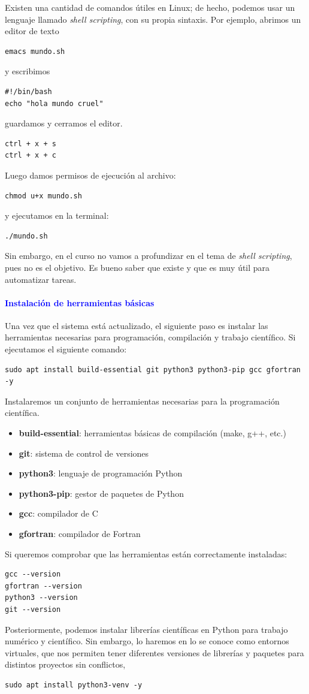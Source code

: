 \documentclass[12pt]{article}
\begin{document}
Existen una cantidad de comandos útiles en Linux; de hecho, podemos usar un lenguaje llamado 
\textit{shell scripting}, con su propia sintaxis. Por ejemplo, abrimos un editor de texto 
\begin{lstlisting}
emacs mundo.sh
\end{lstlisting}  
y escribimos 
\begin{lstlisting}
#!/bin/bash
echo "hola mundo cruel"
\end{lstlisting}  
guardamos y cerramos el editor.
\begin{lstlisting}
ctrl + x + s
ctrl + x + c
\end{lstlisting} 
Luego damos permisos de ejecución al archivo:
\begin{lstlisting}
chmod u+x mundo.sh
\end{lstlisting}
y ejecutamos en la terminal:
\begin{lstlisting}
./mundo.sh
\end{lstlisting}
Sin embargo, en el curso no vamos a profundizar en el tema de \textit{shell scripting}, pues no es el objetivo. 
Es bueno saber que existe y que es muy útil para automatizar tareas.

\paragraph{\textcolor{blue}{Instalación de herramientas básicas}}

Una vez que el sistema está actualizado, el siguiente paso es instalar las herramientas 
necesarias para programación, compilación y trabajo científico.
Si ejecutamos el siguiente comando:
\begin{lstlisting}
sudo apt install build-essential git python3 python3-pip gcc gfortran -y
\end{lstlisting}
Instalaremos un conjunto de herramientas necesarias para la programación científica.
\begin{itemize}
    \item \textbf{build-essential}: herramientas básicas de compilación (make, g++, etc.)
    \item \textbf{git}: sistema de control de versiones
    \item \textbf{python3}: lenguaje de programación Python
    \item \textbf{python3-pip}: gestor de paquetes de Python
    \item \textbf{gcc}: compilador de C
    \item \textbf{gfortran}: compilador de Fortran
\end{itemize}
Si queremos comprobar que las herramientas están correctamente instaladas:
\begin{lstlisting}
gcc --version
gfortran --version
python3 --version
git --version
\end{lstlisting}
Posteriormente, podemos instalar librerías científicas en Python para trabajo numérico y científico. Sin embargo,
lo haremos en lo se conoce como entornos virtuales, que nos permiten tener diferentes versiones de 
librerías y paquetes para distintos proyectos sin conflictos, 
\begin{lstlisting}
sudo apt install python3-venv -y
\end{lstlisting}
\end{document}
